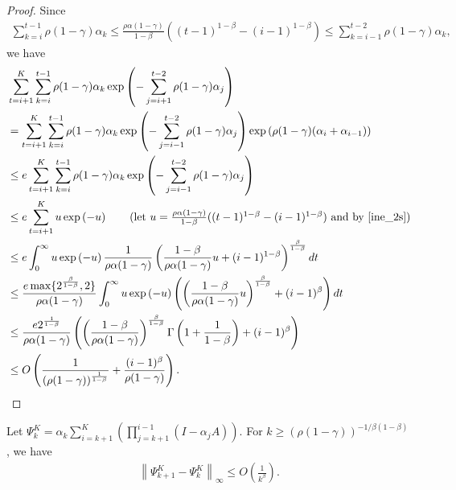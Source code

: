 \documentclass{opt2025} %
\begin{document}
\begin{proof}
Since
\begin{align}
\sum_{k=i}^{t-1}  \rho(1-\gamma) \alpha_k \leq \frac{\rho\alpha(1-\gamma)}{1-\beta} ((t-1)^{1-\beta}-(i-1)^{1-\beta}) \leq \sum_{k=i-1}^{t-2}  \rho(1-\gamma) \alpha_k, \label{ine_2s}
\end{align}
we have
\begin{align*}
&\sum_{t=i+1}^K \sum_{k=i}^{t-1}  \rho(1-\gamma) \alpha_k \exp\left(-\sum_{j=i+1}^{t-2} \rho(1-\gamma)\alpha_j\right)\\
&= \sum_{t=i+1}^K \sum_{k=i}^{t-1}  \rho(1-\gamma) \alpha_k \exp\left(-\sum_{j=i-1}^{t-2} \rho(1-\gamma)\alpha_j\right)\exp\left( \rho(1-\gamma)(\alpha_i+\alpha_{i-1})\right)\\
&\leq e \sum_{t=i+1}^K \sum_{k=i}^{t-1}  \rho(1-\gamma) \alpha_k \exp\left(-\sum_{j=i-1}^{t-2} \rho(1-\gamma)\alpha_j\right)\\
&\leq e \sum_{t=i+1}^K u \exp\left(-u\right) \tag{let $u=\frac{\rho\alpha(1-\gamma)}{1-\beta} ((t-1)^{1-\beta}-(i-1)^{1-\beta})$ and by \cref{ine_2s}}\\
&\leq e \int_{0}^{\infty} u \exp\left(-u\right) \frac{1}{\rho\alpha(1-\gamma)} \left( \frac{1-\beta}{\rho\alpha(1-\gamma)} u + (i-1)^{1-\beta} \right)^{\frac{\beta}{1-\beta}} dt\\
&\leq \frac{e\max\{2^{\frac{\beta}{1-\beta}},2\}}{\rho\alpha(1-\gamma)} \int_{0}^{\infty} u \exp\left(-u\right) \left( \left(\frac{1-\beta}{\rho\alpha(1-\gamma)} u \right)^{\frac{\beta}{1-\beta}} + (i-1)^{\beta} \right) dt\\
&\leq \frac{e2^{\frac{1}{1-\beta}}}{\rho\alpha(1-\gamma)}  \left( \left(\frac{1-\beta}{\rho\alpha(1-\gamma)}  \right)^{\frac{\beta}{1-\beta}}\Gamma\left(1+\frac{1}{1-\beta}\right) + (i-1)^{\beta} \right) \\
&\leq O\left( \frac{1}{(\rho(1-\gamma))^{\frac{1}{1-\beta}}}  + \frac{(i-1)^{\beta}}{\rho(1-\gamma)}   \right).
\end{align*}
\end{proof}

\begin{lemma}
\label{lem_difpsi}
Let $\Psi_k^K= \alpha_k \sum_{i=k+1}^{K} \left( \prod_{j=k+1}^{i-1} (I - \alpha_j A) \right)$. For $k \geq (\rho(1-\gamma))^{-1/\beta(1-\beta)}$, we have
\begin{align*}
\left\| \Psi_{k+1}^K - \Psi_{k}^K \right\|_{\infty} \leq O\left( \frac{1}{k^{\beta}}\right).
\end{align*}
\end{lemma}
\end{document}
